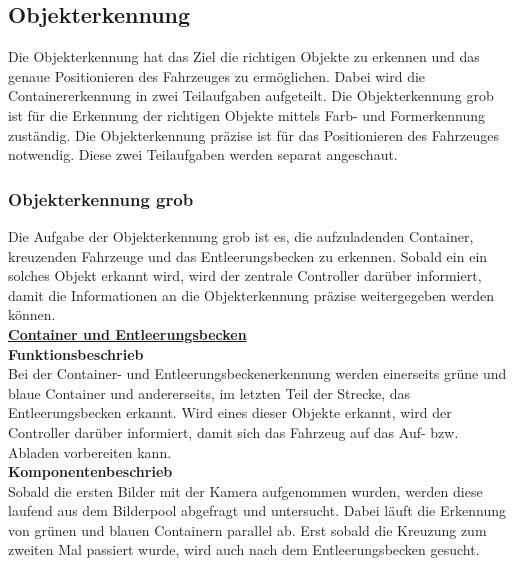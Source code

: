 \subsection{Objekterkennung}
Die Objekterkennung hat das Ziel die richtigen Objekte zu erkennen und das genaue Positionieren des Fahrzeuges zu ermöglichen. Dabei wird die Containererkennung in zwei Teilaufgaben aufgeteilt. Die Objekterkennung grob ist für die Erkennung der richtigen Objekte mittels Farb- und Formerkennung zuständig. Die Objekterkennung präzise ist für das Positionieren des Fahrzeuges notwendig. Diese zwei Teilaufgaben werden separat angeschaut.
%
\subsubsection{Objekterkennung grob}
Die Aufgabe der Objekterkennung grob ist es, die aufzuladenden Container, kreuzenden Fahrzeuge und das Entleerungsbecken zu erkennen. Sobald ein ein solches Objekt erkannt wird, wird der zentrale Controller darüber informiert, damit die Informationen an die Objekterkennung präzise weitergegeben werden können.
\\[0.2cm]
\underline{\textbf{Container und Entleerungsbecken}}
\\[0.2cm]
\textbf{Funktionsbeschrieb}\\[0.2cm]
Bei der Container- und Entleerungsbeckenerkennung werden einerseits grüne und blaue Container und andererseits, im letzten Teil der Strecke, das Entleerungsbecken erkannt. Wird eines dieser Objekte erkannt, wird der Controller darüber informiert, damit sich das Fahrzeug auf das Auf- bzw. Abladen vorbereiten kann.
\\[0.2cm]
\textbf{Komponentenbeschrieb}\\[0.2cm]
Sobald die ersten Bilder mit der Kamera aufgenommen wurden, werden diese laufend aus dem Bilderpool abgefragt und untersucht. Dabei läuft die Erkennung von grünen und blauen Containern parallel ab. Erst sobald die Kreuzung zum zweiten Mal passiert wurde, wird auch nach dem Entleerungsbecken gesucht.
